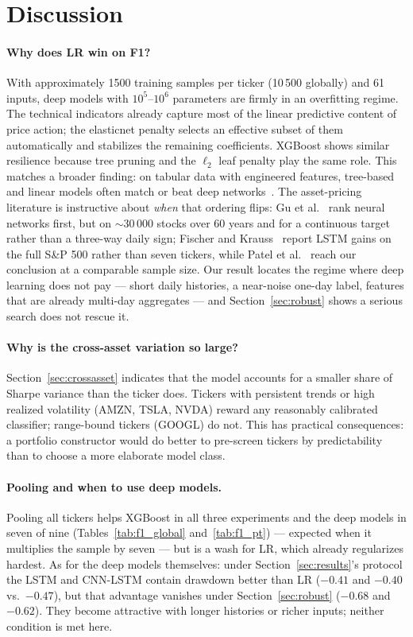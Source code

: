 \documentclass[runningheads]{llncs}
\begin{document}
\section{Discussion}
\label{sec:discussion}

\paragraph{Why does LR win on F1?}
With approximately 1500 training samples per ticker (10\,500 globally) and 61 inputs, deep models with $10^5$--$10^6$ parameters are firmly in an overfitting regime. The technical indicators already capture most of the linear predictive content of price action; the elasticnet penalty selects an effective subset of them automatically and stabilizes the remaining coefficients. XGBoost shows similar resilience because tree pruning and the $\ell_2$ leaf penalty play the same role. This matches a broader finding: on tabular data with engineered features, tree-based and linear models often match or beat deep networks~\cite{grinsztajn2022}. The asset-pricing literature is instructive about \emph{when} that ordering flips: Gu et al.~\cite{gukellyxiu2020} rank neural networks first, but on $\sim$30\,000 stocks over 60 years and for a continuous target rather than a three-way daily sign; Fischer and Krauss~\cite{fischer2018} report LSTM gains on the full S\&P 500 rather than seven tickers, while Patel et al.~\cite{patel2015} reach our conclusion at a comparable sample size. Our result locates the regime where deep learning does not pay --- short daily histories, a near-noise one-day label, features that are already multi-day aggregates --- and Section~\ref{sec:robust} shows a serious search does not rescue it.

\paragraph{Why is the cross-asset variation so large?}
Section~\ref{sec:crossasset} indicates that the model accounts for a smaller share of Sharpe variance than the ticker does. Tickers with persistent trends or high realized volatility (AMZN, TSLA, NVDA) reward any reasonably calibrated classifier; range-bound tickers (GOOGL) do not. This has practical consequences: a portfolio constructor would do better to pre-screen tickers by predictability than to choose a more elaborate model class.

\paragraph{Pooling and when to use deep models.}
Pooling all tickers helps XGBoost in all three experiments and the deep models in seven of nine (Tables~\ref{tab:f1_global} and~\ref{tab:f1_pt}) --- expected when it multiplies the sample by seven --- but is a wash for LR, which already regularizes hardest. As for the deep models themselves: under Section~\ref{sec:results}'s protocol the LSTM and CNN-LSTM contain drawdown better than LR ($-0.41$ and $-0.40$ vs.\ $-0.47$), but that advantage vanishes under Section~\ref{sec:robust} ($-0.68$ and $-0.62$). They become attractive with longer histories or richer inputs; neither condition is met here.
\end{document}
